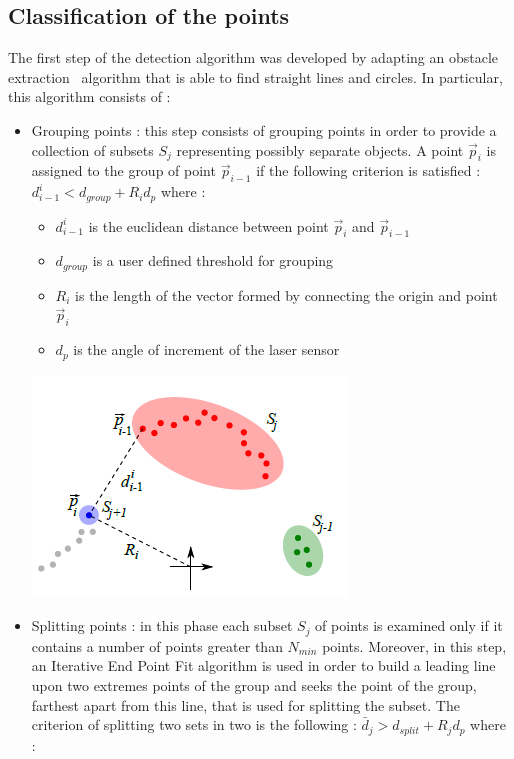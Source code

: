 \subsection{Classification of the points}
The first step of the detection algorithm was developed by adapting an obstacle extraction~\cite{detection-and-tracking-2d-geometric-obstacles-from-lrf-data} algorithm that is able to find straight lines and circles. 
In particular, this algorithm consists of :
\begin{itemize}
    \item Grouping points : this step consists of grouping points in order to provide a collection of subsets \(S_{j}\)  representing possibly separate objects. A point \(\vec{p}_{i}\) is assigned to the group of point \(\vec{p}_{i-1}\) if the following criterion is satisfied : \(d_{i-1}^{i} < d_{group} + R_{i}d_{p}\) where :
    \begin{itemize}
        \item \(d_{i-1}^{i}\) is the euclidean distance between point \(\vec{p}_{i}\) and \(\vec{p}_{i-1}\)
        \item \(d_{group}\) is a user defined threshold for grouping
        \item \(R_{i}\) is the length of the vector formed by connecting the origin and point \(\vec{p}_{i}\)
        \item \(d_{p}\) is the angle of increment of the laser sensor
    \end{itemize}
    \begin{center}
        \includegraphics[scale=0.5]{images/detection/grouping-points.png}    
    \end{center}    
    \item Splitting points : in this phase each subset \(S_{j}\) of points is examined only if it contains a number of points greater than \(N_{min}\) points. Moreover, in this step, an Iterative End Point Fit algorithm is used in order to build a leading line upon two extremes points of the group and seeks the point of the group, farthest apart from this line, that is used for splitting the subset. The criterion of splitting two sets in two is the following : \(\bar{d}_{j} > d_{split} + R_{j}d_{p}\) where :

\end{itemize}
